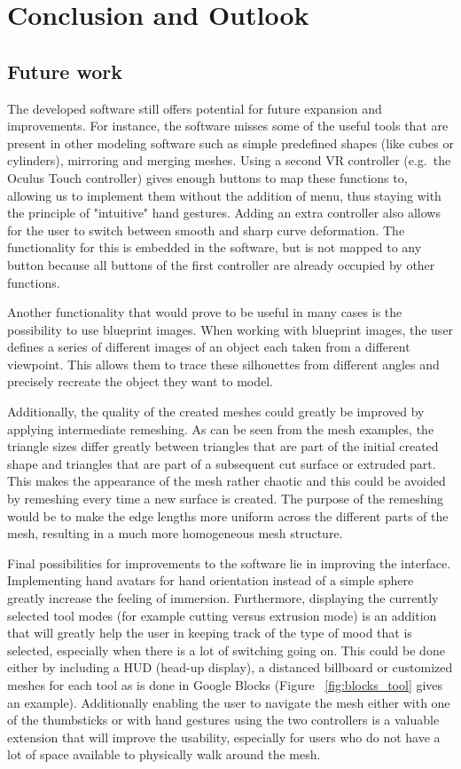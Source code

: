 \chapter{Conclusion and Outlook}
\label{chap:conclusion}

\section{Future work}
The developed software still offers potential for future expansion and improvements. For instance, the software misses some of the useful tools that are present in other modeling software such as simple predefined shapes (like cubes or cylinders), mirroring and merging meshes. Using a second VR controller (e.g.\ the Oculus Touch controller) gives enough buttons to map these functions to, allowing us to implement them without the addition of menu, thus staying with the principle of "intuitive" hand gestures. Adding an extra controller also allows for the user to switch between smooth and sharp curve deformation. The functionality for this is embedded in the software, but is not mapped to any button because all buttons of the first controller are already occupied by other functions. 

Another functionality that would prove to be useful in many cases is the possibility to use blueprint images. When working with blueprint images, the user defines a series of different images of an object each taken from a different viewpoint. This allows them to trace these silhouettes from different angles and precisely recreate the object they want to model.

Additionally, the quality of the created meshes could greatly be improved by applying intermediate remeshing. As can be seen from the mesh examples, the triangle sizes differ greatly between triangles that are part of the initial created shape and triangles that are part of a subsequent cut surface or extruded part. This makes the appearance of the mesh rather chaotic and this could be avoided by remeshing every time a new surface is created. The purpose of the remeshing would be to make the edge lengths more uniform across the different parts of the mesh, resulting in a much more homogeneous mesh structure.

Final possibilities for improvements to the software lie in improving the interface. Implementing hand avatars for hand orientation instead of a simple sphere greatly increase the feeling of immersion. Furthermore, displaying the currently selected tool modes (for example cutting versus extrusion mode) is an addition that will greatly help the user in keeping track of the type of mood that is selected, especially when there is a lot of switching going on. This could be done either by including a HUD (head-up display), a distanced billboard or customized meshes for each tool as is done in Google Blocks (Figure ~\ref{fig:blocks_tool} gives an example). Additionally enabling the user to navigate the mesh either with one of the thumbsticks or with hand gestures using the two controllers is a valuable extension that will improve the usability, especially for users who do not have a lot of space available to physically walk around the mesh. 

